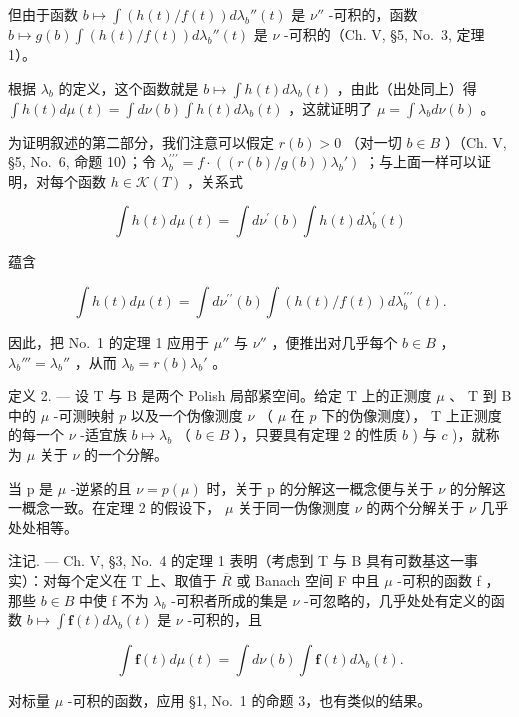 但由于函数 \(b \mapsto \int (h(t) / f(t)) d\lambda_b''(t)\) 是 \(\nu''\) -可积的，函数 \(b \mapsto g(b) \int (h(t) / f(t)) d\lambda_b''(t)\) 是 \(\nu\) -可积的（Ch. V, §5, No.~3, 定理 1）。

根据 \(\lambda_b\) 的定义，这个函数就是 \(b \mapsto \int h(t) d\lambda_b(t)\) ，由此（出处同上）得 \(\int h(t) d\mu(t) = \int d\nu(b) \int h(t) d\lambda_b(t)\) ，这就证明了 \(\mu = \int \lambda_b d\nu(b)\) 。

为证明叙述的第二部分，我们注意可以假定 \(r(b) > 0\) （对一切 \(b \in B\) ）（Ch. V, §5, No.~6, 命题 10）；令 \(\lambda_b^{\prime \prime \prime} = f \cdot \left( \left( r(b) / g(b) \right) \lambda_b' \right)\) ；与上面一样可以证明，对每个函数 \(h \in \mathcal{K}(T)\) ，关系式

\[
\int h (t) d \mu (t) = \int d \nu^ {\prime} (b) \int h (t) d \lambda_ {b} ^ {\prime} (t)
\]

蕴含

\[
\int h (t) d \mu (t) = \int d \nu^ {\prime \prime} (b) \int \left(h (t) / f (t)\right) d \lambda_ {b} ^ {\prime \prime \prime} (t).
\]

因此，把 No.~1 的定理 1 应用于 \(\mu''\) 与 \(\nu''\) ，便推出对几乎每个 \(b \in B\) ， \(\lambda_b''' = \lambda_b''\) ，从而 \(\lambda_b = r(b)\lambda_b'\) 。

定义 2. --- 设 T 与 B 是两个 Polish 局部紧空间。给定 T 上的正测度 \(\mu\) 、 T 到 B 中的 \(\mu\) -可测映射 \(p\) 以及一个伪像测度 \(\nu\) （ \(\mu\) 在 \(p\) 下的伪像测度）， T 上正测度的每一个 \(\nu\) -适宜族 \(b \mapsto \lambda_b\) （ \(b \in B\) ），只要具有定理 2 的性质 \(b\) ) 与 \(c\) )，就称为 \(\mu\) 关于 \(\nu\) 的一个分解。

当 p 是 \(\mu\) -逆紧的且 \(\nu = p(\mu)\) 时，关于 p 的分解这一概念便与关于 \(\nu\) 的分解这一概念一致。在定理 2 的假设下， \(\mu\) 关于同一伪像测度 \(\nu\) 的两个分解关于 \(\nu\) 几乎处处相等。

注记. --- Ch. V, §3, No.~4 的定理 1 表明（考虑到 T 与 B 具有可数基这一事实）：对每个定义在 T 上、取值于 \(\overline{R}\) 或 Banach 空间 F 中且 \(\mu\) -可积的函数 f ，那些 \(b \in B\) 中使 f 不为 \(\lambda_{b}\) -可积者所成的集是 \(\nu\) -可忽略的，几乎处处有定义的函数 \(b \mapsto \int \mathbf{f}(t) d\lambda_{b}(t)\) 是 \(\nu\) -可积的，且

\[
\int \mathbf {f} (t) d \mu (t) = \int d \nu (b) \int \mathbf {f} (t) d \lambda_ {b} (t).
\]

对标量 \(\mu\) -可积的函数，应用 §1, No.~1 的命题 3，也有类似的结果。

